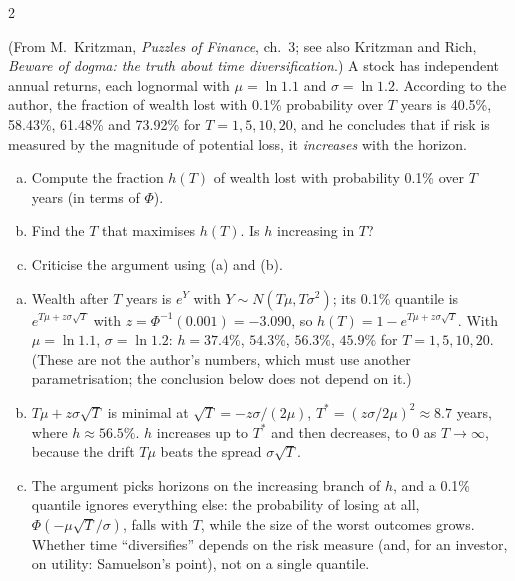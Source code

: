 \begin{paracol}{2}
\begin{exercise}\label{ch03:ex-timediv}
(From M.~Kritzman, \emph{Puzzles of Finance}, ch.~3; see also Kritzman and Rich, \emph{Beware of dogma: the truth
about time diversification}.) A stock has independent annual returns, each lognormal with $\mu=\ln1.1$ and
$\sigma=\ln1.2$. According to the author, the fraction of wealth lost with 0.1\% probability over $T$ years is
40.5\%, 58.43\%, 61.48\% and 73.92\% for $T=1,5,10,20$, and he concludes that if risk is measured by the
magnitude of potential loss, it \emph{increases} with the horizon.
\begin{enumerate}[(a)]
  \item Compute the fraction $h(T)$ of wealth
      lost with probability 0.1\% over $T$ years (in terms of $\Phi$).
  \item Find the $T$ that maximises $h(T)$. Is $h$
      increasing in $T$?
  \item Criticise the argument using (a) and (b).
\end{enumerate}
\end{exercise}
\begin{solution}[ch03:ex-timediv]
\begin{enumerate}[(a)]
  \item Wealth after $T$ years is $e^{Y}$ with $Y\sim N(T\mu,T\sigma^2)$; its 0.1\% quantile is $e^{T\mu+z\sigma\sqrt T}$ with $z=\Phi^{-1}(0.001)=-3.090$,
        so $h(T)=1-e^{T\mu+z\sigma\sqrt T}$. With $\mu=\ln1.1$, $\sigma=\ln1.2$: $h=37.4\%$, $54.3\%$, $56.3\%$, $45.9\%$ for $T=1,5,10,20$.
        (These are not the author's numbers, which must use another parametrisation; the conclusion below does not depend on it.)
  \item $T\mu+z\sigma\sqrt T$ is minimal at $\sqrt T=-z\sigma/(2\mu)$, $T^*=(z\sigma/2\mu)^2\approx8.7$ years, where $h\approx56.5\%$. $h$ increases up to
        $T^*$ and then decreases, to 0 as $T\to\infty$, because the drift $T\mu$ beats the spread $\sigma\sqrt T$.
  \item The argument picks horizons on the increasing branch of $h$, and a 0.1\% quantile ignores everything else: the
        probability of losing at all, $\Phi(-\mu\sqrt T/\sigma)$, falls with $T$, while the size of the worst outcomes grows. Whether time
        ``diversifies'' depends on the risk measure (and, for an investor, on utility: Samuelson's point), not on a single quantile.
\end{enumerate}
\end{solution}


\end{paracol}
